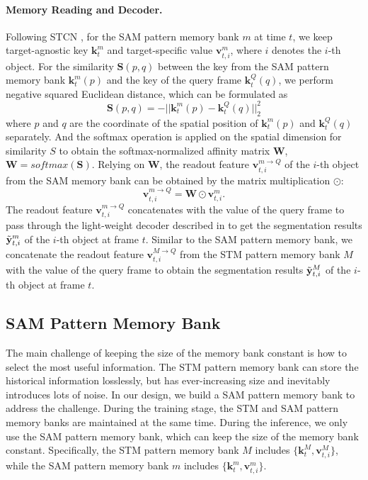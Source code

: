 \documentclass[10pt,twocolumn,letterpaper]{article}
\begin{document}
\paragraph{Memory Reading and Decoder.}
Following STCN \cite{cheng2021rethinking}, for the SAM pattern memory bank $m$ at time $t$,  we keep target-agnostic key $\textbf{k}^m_t$ and target-specific value $\textbf{v}^m_{t,i}$, where $i$ denotes the $i$-th object. For the similarity $\textbf{S}(p,q)$ between the key from the SAM pattern memory bank $\textbf{k}^m_t(p)$ and the key of the query frame $\textbf{k}^Q_t(q)$, we perform negative squared Euclidean distance, which can be formulated as 
\begin{equation}
    \label{eq:stm_similarity}
    \textbf{S}(p,q) = -||\textbf{k}^m_t(p)-\textbf{k}^Q_t(q)||^2_2
\end{equation}
where $p$ and $q$ are the coordinate of the spatial
position of $\textbf{k}^m_t(p)$ and $\textbf{k}^Q_t(q)$ separately. And the softmax operation is applied on the spatial dimension for similarity $S$ to obtain the  softmax-normalized affinity matrix $\textbf{W}$, $\textbf{W} = softmax(\textbf{S})$. Relying on $\textbf{W}$, the readout feature $\textbf{v}^{m\rightarrow Q}_{t,i}$ of the $i$-th object from the SAM memory bank can be obtained by the matrix multiplication $\odot$: 
\begin{equation}
    \label{eq:stm_reweight}
    \textbf{v}^{m\rightarrow Q}_{t,i} =  \textbf{W} \odot \textbf{v}^m_{t,i}.
\end{equation}
The readout feature $\textbf{v}^{m\rightarrow Q}_{t,i}$ concatenates with the value of the query frame to pass through the light-weight decoder described in \cite{cheng2021rethinking} to get the segmentation results $\Tilde{\textbf{y}}^{m}_{t, i}$ of the $i$-th object at frame $t$. Similar to the SAM pattern memory bank, we concatenate the readout feature $\textbf{v}^{M\rightarrow Q}_{t,i}$ from the STM pattern memory bank $M$ with the value of the query frame to obtain the segmentation results $\Tilde{\textbf{y}}^{M}_{t, i}$ of the $i$-th object at frame $t$.






\subsection{SAM Pattern Memory Bank}
The main challenge of keeping the size of the memory bank constant is how to select the most useful information. The STM pattern memory bank can store the historical information losslessly, but has ever-increasing size and inevitably introduces lots of noise. In our design, we build a SAM pattern memory bank to address the challenge. During the training stage, the STM and SAM pattern memory banks are maintained at the same time. During the inference, we only use the SAM pattern memory bank, which can keep the size of the memory bank constant. Specifically, the STM pattern memory bank $M$ includes $\{\textbf{k}^M_{t}, \textbf{v}^M_{t,i}\}$, while the SAM pattern memory bank $m$ includes $\{\textbf{k}^m_{t}, \textbf{v}^m_{t,i}\}$.  
\end{document}
